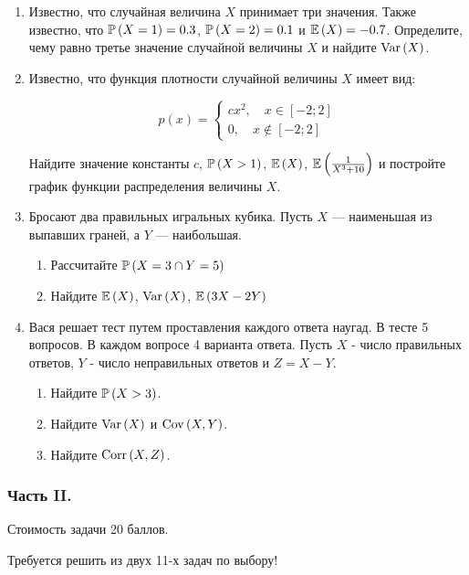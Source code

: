 \begin{enumerate}
\item Известно, что случайная величина  $X$  принимает три значения. Также известно,
что  $\P\left(X=1\right)=0.3$, $\P\left(X=2\right)=0.1$ и $\E\left(X\right) = -0.7$.
Определите, чему равно третье значение случайной величины $X$ и найдите
$\Var\left(X\right)$.

\item Известно, что функция плотности случайной величины  $X$  имеет вид:

\[
p\left(x\right) = \begin{cases}
cx^{2} , \quad x\in [-2;2] \\
0,\quad x\notin [-2;2]
\end{cases}
\]

Найдите значение константы $c$, $\P\left(X>1\right)$, $\E\left(X\right)$,
$\E\left(\frac{1}{X^{3} +10} \right)$ и постройте график функции распределения
величины $X$.

\item Бросают два правильных игральных кубика. Пусть  $X$  — наименьшая из выпавших
граней, а $Y$ — наибольшая.
\begin{enumerate}
\item Рассчитайте  $\P\left(X=3\cap Y=5\right)$
\item Найдите  $\E\left(X\right)$, $\Var\left(X\right)$, $\E\left(3X-2Y\right)$
\end{enumerate}

\item Вася решает тест путем проставления каждого ответа наугад. В тесте 5 вопросов.
В каждом вопросе 4 варианта ответа. Пусть  $X$  - число правильных ответов, $Y$ -
число неправильных ответов и $Z = X - Y$.
\begin{enumerate}
\item Найдите $\P\left(X > 3\right)$.
\item Найдите $\Var\left(X\right)$ и $\Cov\left(X, Y\right)$.
\item Найдите $\Corr\left(X,Z\right)$.
\end{enumerate}
\end{enumerate}

\subsubsection*{Часть II.}

Стоимость задачи 20 баллов.

Требуется решить {\bf {}} из двух 11-х задач по выбору!

